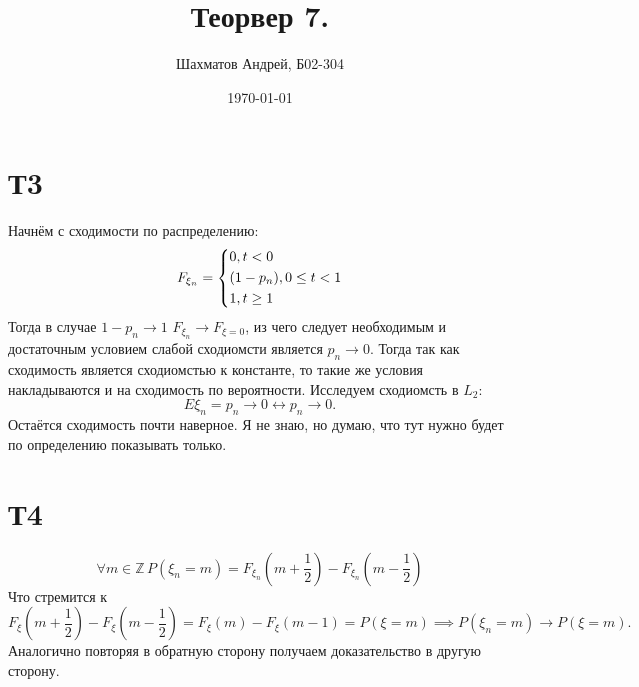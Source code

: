 \documentclass[12pt]{article}
\title{Теорвер 7.}
\author{Шахматов Андрей, Б02-304}
\date{\today}
\begin{document}
\maketitle
\tableofcontents

\section{Т3}
Начнём с сходимости по распределению:
\[
    F_{\xi_n} = 
    \begin{dcases}
        0, t < 0 \\
        (1 - p_n), 0 \leq t < 1 \\
        1, t \geq 1
    \end{dcases}
\]
Тогда в случае $1 - p_n \to 1$ $F_{\xi_n} \to F_{\xi = 0}$, из чего следует необходимым и достаточным условием 
слабой сходиомсти является $p_n \to 0$. Тогда так как сходимость является сходиомстью к константе, то такие же 
условия накладываются и на сходимость по вероятности. 
Исследуем сходиомсть в $L_2$: 
\[
    E \xi_n = p_n \to 0 \leftrightarrow p_n \to 0. 
\]    
Остаётся сходимость почти наверное. Я не знаю, но думаю, что тут нужно будет по определению показывать только.

\section{Т4}
\[
    \forall m \in \mathbb{Z} \, P(\xi_n = m) = 
    F_{\xi_n}\left( m + \frac{1}{2} \right) - F_{\xi_n}\left( m - \frac{1}{2} \right)
\]
Что стремится к
\[
    F_{\xi}\left( m + \frac{1}{2} \right) - F_{\xi}\left( m - \frac{1}{2} \right) = 
    F_\xi(m) - F_\xi(m-1) = P(\xi = m) \implies P(\xi_n = m) \to P(\xi = m).
\]
Аналогично повторяя в обратную сторону получаем доказательство в другую сторону.
\end{document}
